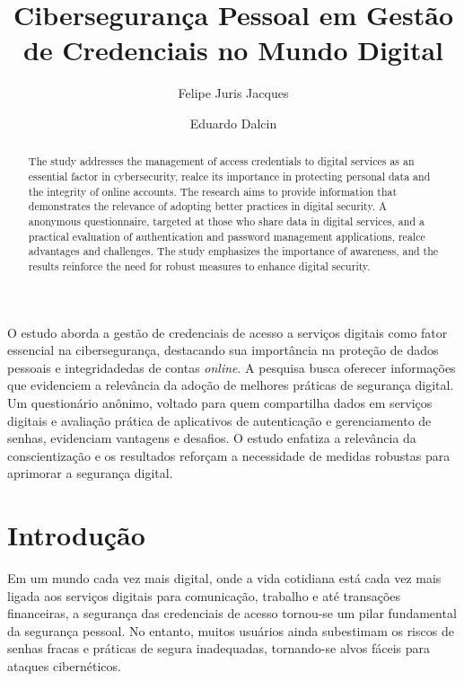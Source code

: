\documentclass[12pt]{article}
\title{Cibersegurança Pessoal em Gestão de Credenciais no Mundo Digital}
\author{Felipe Juris Jacques\inst{1} \and Eduardo Dalcin\inst{1} }
\begin{document}
 

\maketitle

\begin{abstract}
  The study addresses the management of access credentials to digital services as an
  essential factor in cybersecurity, realce its importance in protecting personal
  data and the integrity of online accounts.
  The research aims to provide information that demonstrates the relevance of adopting
  better practices in digital security.
  A anonymous questionnaire, targeted at those who share data in digital services, and a
  practical evaluation of authentication and password management applications, realce
  advantages and challenges.
  The study emphasizes the importance of awareness, and the results reinforce the need for
  robust measures to enhance digital security.
\end{abstract}
     
\begin{resumo}
  O estudo aborda a gestão de credenciais de acesso a serviços digitais como fator
  essencial na cibersegurança, destacando sua importância na proteção de dados pessoais
  e integridadedas de contas \textit{online}.
  A pesquisa busca oferecer informações que evidenciem a relevância da adoção de
  melhores práticas de segurança digital.
  Um questionário anônimo, voltado para quem compartilha dados em serviços digitais e
  avaliação prática de aplicativos de autenticação e gerenciamento de senhas, evidenciam
  vantagens e desafios.
  O estudo enfatiza a relevância da conscientização e os resultados reforçam a
  necessidade de medidas robustas para aprimorar a segurança digital.
\end{resumo}

\section{Introdução}

Em um mundo cada vez mais digital, onde a vida cotidiana está cada vez mais ligada aos
serviços digitais para comunicação, trabalho e até transações financeiras, a segurança
das credenciais de acesso tornou-se um pilar fundamental da segurança pessoal.
No entanto, muitos usuários ainda subestimam os riscos de senhas fracas e práticas
de segura inadequadas, tornando-se alvos fáceis para ataques cibernéticos.
\end{document}
